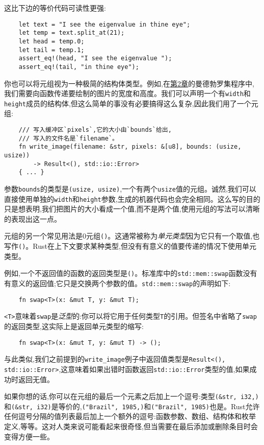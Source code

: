 这比下边的等价代码可读性更强:
\begin{verbatim}
    let text = "I see the eigenvalue in thine eye";
    let temp = text.split_at(21);
    let head = temp.0;
    let tail = temp.1;
    assert_eq!(head, "I see the eigenvalue ");
    assert_eq!(tail, "in thine eye");
\end{verbatim}

你也可以将元组视为一种极简的结构体类型。例如,在\hyperref[ch02]{第2章}的曼德勃罗集程序中,我们需要向函数传递要绘制的图片的宽度和高度。我们可以声明一个有\texttt{width}和\texttt{height}成员的结构体,但这么简单的事没有必要搞得这么复杂,因此我们用了一个元组:
\begin{verbatim}
    /// 写入缓冲区`pixels`,它的大小由`bounds`给出,
    /// 写入的文件名是`filename`。
    fn write_image(filename: &str, pixels: &[u8], bounds: (usize, usize))
        -> Result<(), std::io::Error>
    { ... }
\end{verbatim}

参数\texttt{bounds}的类型是\texttt{(usize, usize)},一个有两个\texttt{usize}值的元组。诚然,我们可以直接使用单独的\texttt{width}和\texttt{height}参数,生成的机器代码也会完全相同。这么写的目的只是想表明,我们把图片的大小看成一个值,而不是两个值,使用元组的写法可以清晰的表现出这一点。

元组的另一个常见用法是0元组\texttt{()}。这通常被称为\emph{单元类型}因为它只有一个取值,也写作\texttt{()}。Rust在上下文要求某种类型,但没有有意义的值要传递的情况下使用单元类型。

例如,一个不返回值的函数的返回类型是\texttt{()}。标准库中的\texttt{std::mem::swap}函数没有有意义的返回值;它只是交换两个参数的值。\texttt{std::mem::swap}的声明如下:
\begin{verbatim}
    fn swap<T>(x: &mut T, y: &mut T);
\end{verbatim}
\texttt{<T>}意味着\texttt{swap}是\emph{泛型}的:你可以将它用于任何类型\texttt{T}的引用。但签名中省略了\texttt{swap}的返回类型,这实际上是返回单元类型的缩写:
\begin{verbatim}
    fn swap<T>(x: &mut T, y: &mut T) -> ();
\end{verbatim}

与此类似,我们之前提到的\texttt{write\_image}例子中返回值类型是\texttt{Result<(), std::io::Error>},这意味着如果出错时函数返回\texttt{std::io::Error}类型的值,如果成功时返回无值。

如果你想的话,你可以在元组的最后一个元素之后加上一个逗号:类型\texttt{(\&str, i32,)}和\texttt{(\&str, i32)}是等价的,\texttt{("Brazil", 1985,)}和\texttt{("Brazil", 1985)}也是。Rust允许任何逗号分隔的值列表最后加上一个额外的逗号:函数参数、数组、结构体和枚举定义,等等。这对人类来说可能看起来很奇怪,但当需要在最后添加或删除条目时会变得方便一些。

